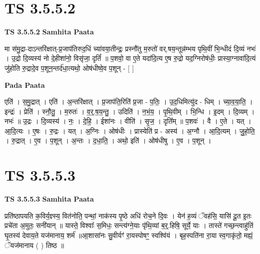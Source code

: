 \documentclass[17pt]{extarticle}
\begin{document}
\section{ TS 3.5.5.2 }

\textbf{TS 3.5.5.2 } \newline
\textbf{Samhita Paata} \newline

मा स॑मु॒द्रा-दाऽन्तरि॑क्षात्-प्र॒जाप॑तिरुद॒धिं च्या॑वया॒तीन्द्रः॒ प्रस्नौ॑तु म॒रुतो॑ वर्.षय॒न्तून्न॑म्भय पृथि॒वीं भि॒न्धीदं दि॒व्यं नभः॑ । उ॒द्रो दि॒व्यस्य॑ नो दे॒हीशा॑नो॒ विसृ॑जा॒ दृतिं᳚ ॥ प॒शवो॒ वा ए॒ते यदा॑दि॒त्य ए॒ष रु॒द्रो यद॒ग्निरोष॑धीः॒ प्रास्या॒ग्नावा॑दि॒त्यं जु॑होति रु॒द्रादे॒व प॒शून॒न्तर्द॑धा॒त्यथो॒ ओष॑धीष्वे॒व प॒शून् - [  ] \newline

\textbf{Pada Paata} \newline

एति॑ । स॒मु॒द्रात् । एति॑ । अ॒न्तरि॑क्षात् । प्र॒जाप॑ति॒रिति॑ प्र॒जा - प॒तिः॒ । उ॒द॒धिमित्यु॑द - धिम् । च्या॒व॒या॒ति॒ । इन्द्रः॑ । प्रेति॑ । स्नौ॒तु॒ । म॒रुतः॑ । व॒र्॒.ष॒य॒न्तु॒ । उदिति॑ । न॒भं॒य॒ । पृ॒थि॒वीम् । भि॒न्धि । इ॒दम् । दि॒व्यम् । नभः॑ ॥ उ॒द्रः । दि॒व्यस्य॑ । नः॒ । दे॒हि॒ । ईशा॑नः । वीति॑ । सृ॒ज॒ । दृति᳚म् ॥ प॒शवः॑ । वै । ए॒ते । यत् । आ॒दि॒त्यः । ए॒षः । रु॒द्रः । यत् । अ॒ग्निः । ओष॑धीः । प्रास्येति॑ प्र - अस्य॑ । अ॒ग्नौ । आ॒दि॒त्यम् । जु॒हो॒ति॒ । रु॒द्रात् । ए॒व । प॒शून् । अ॒न्तः । द॒धा॒ति॒ । अथो॒ इति॑ । ओष॑धीषु । ए॒व । प॒शून् ।  \newline





\section{ TS 3.5.5.3 }

\textbf{TS 3.5.5.3 } \newline
\textbf{Samhita Paata} \newline

प्रति॑ष्ठापयति क॒विर्य॒ज्ञ्स्य॒ वित॑नोति॒ पन्थां॒ नाक॑स्य पृ॒ष्ठे अधि॑ रोच॒ने दि॒वः । येन॑ ह॒व्यं ॅवह॑सि॒ यासि॑ दू॒त इ॒तः प्रचे॑ता अ॒मुतः॒ सनी॑यान् ॥ यास्ते॒ विश्वाः᳚ स॒मिधः॒ सन्त्य॑ग्ने॒याः पृ॑थि॒व्यां ब॒र्॒.हिषि॒ सूर्ये॒ याः । तास्ते॑ गच्छ॒न्त्वाहु॑तिं घृ॒तस्य॑ देवाय॒ते यज॑मानाय॒ शर्म॑ ॥आ॒शासा॑नः सु॒वीर्यꣳ॑ रा॒यस्पोषꣳ॒॒ स्वश्वि॑यं । बृह॒स्पति॑ना रा॒या स्व॒गाकृ॑तो॒ मह्यं॒ ॅयज॑मानाय ( ) तिष्ठ ॥ \newline
\end{document}
